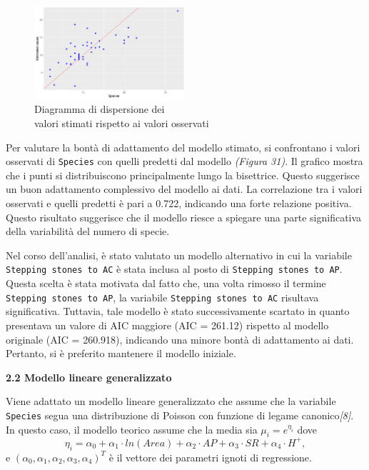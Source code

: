 \documentclass{article} %
\begin{document}
\begin{figure}[H]
    \centering
    \includegraphics[width=0.5\textwidth]{immagini/res_val_oss_lm.png}
    \captionsetup{justification=centering}
    \caption{Diagramma di dispersione dei \\valori stimati rispetto ai valori osservati}
\end{figure}

Per valutare la bontà di adattamento del modello stimato, si confrontano i valori osservati di \texttt{Species} con quelli predetti dal modello \textit{(Figura 31)}. Il grafico mostra che i punti si distribuiscono principalmente lungo la bisettrice. Questo suggerisce un buon adattamento complessivo del modello ai dati. La correlazione tra i valori osservati e quelli predetti è pari a 0.722, indicando una forte relazione positiva. Questo risultato suggerisce che il modello riesce a spiegare una parte significativa della variabilità del numero di specie.

Nel corso dell'analisi, è stato valutato un modello alternativo in cui la variabile \texttt{Stepping stones to AC} è stata inclusa al posto di \texttt{Stepping stones to AP}. Questa scelta è stata motivata dal fatto che, una volta rimosso il termine \texttt{Stepping stones to AP}, la variabile \texttt{Stepping stones to AC} risultava significativa. Tuttavia, tale modello è stato successivamente scartato in quanto presentava un valore di AIC maggiore (AIC = 261.12) rispetto al modello originale (AIC = 260.918), indicando una minore bontà di adattamento ai dati. Pertanto, si è preferito mantenere il modello iniziale.

\vskip 20pt
\begin{flushleft}
    \textbf{\Large 2.2 \: Modello lineare generalizzato}
\end{flushleft}
\vskip 10pt

Viene adattato un modello lineare generalizzato che assume che la variabile \texttt{Species} segua una distribuzione di Poisson con funzione di legame canonico\textit{[8]}. In questo caso, il modello teorico assume che la media sia $\mu_i=e^{\eta_i}$ dove
\[
\eta_i=\alpha_0+\alpha_1 \cdot ln(Area)+\alpha_2\cdot AP +\alpha_3\cdot SR+\alpha_4\cdot H^+ ,
\]
e $(\alpha_0,\alpha_1,\alpha_2,\alpha_3,\alpha_4)^T$ è il vettore dei parametri ignoti di regressione.
\end{document}
